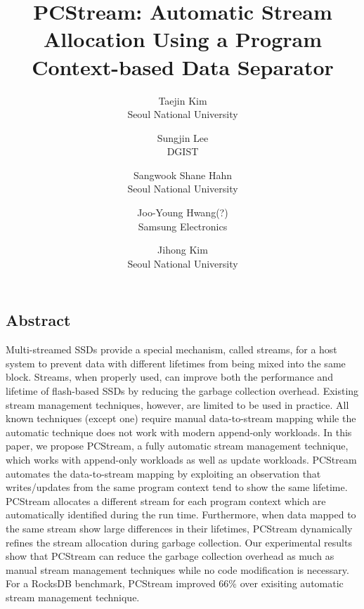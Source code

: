 \documentclass[letterpaper, twocolumn, 10pt]{article}
\begin{document}
\title{
\bf PCStream: Automatic Stream Allocation Using a Program Context-based Data Separator
}


\author{
{\rm Taejin Kim}\\
Seoul National University
\and 
{\rm Sungjin Lee}\\
DGIST
\and 
{\rm Sangwook Shane Hahn}\\
Seoul National University
\and 
{\rm Joo-Young Hwang(?)} \\
Samsung Electronics
\and 
{\rm Jihong Kim} \\
Seoul National University
}

\maketitle

\thispagestyle{empty}

\subsection*{Abstract}
Multi-streamed SSDs provide a special mechanism, called streams,
for a host system to prevent data with different lifetimes from being
mixed into the same block. 
Streams, when properly used, can
improve both the performance and lifetime of flash-based SSDs by
reducing the garbage collection overhead. 
Existing stream
management techniques, however, are limited to be used in
practice. 
All known techniques (except one) require manual data-to-stream 
mapping while the automatic technique does not work with
modern append-only workloads. 
In this paper, we propose
PCStream, a fully automatic stream management technique, which
works with append-only workloads as well as update workloads.
PCStream automates the data-to-stream mapping by exploiting an
observation that writes/updates from the same program context
tend to show the same lifetime. 
PCStream allocates a different
stream for each program context which are automatically identified
during the run time. 
Furthermore, when data mapped to the same
stream show large differences in their lifetimes, PCStream
dynamically refines the stream allocation during garbage collection.
Our experimental results show that PCStream can reduce the
garbage collection overhead as much as manual stream
management techniques while no code modification is necessary.
For a RocksDB benchmark, PCStream improved 66\% over 
exisiting automatic stream management technique.








\end{document}
